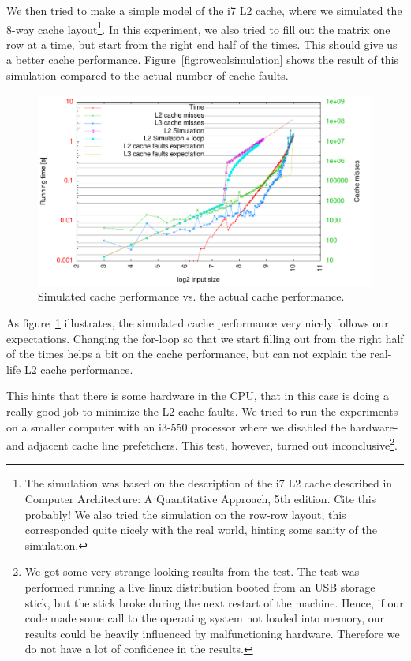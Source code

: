 We then tried to make a simple model of the i7 L2 cache, where we
simulated the 8-way cache layout\footnote{The simulation was based on
  the description of the i7 L2 cache described in Computer
  Architecture: A Quantitative Approach, 5th edition. Cite this
  probably! We also tried the simulation on the row-row layout, this
  corresponded quite nicely with the real world, hinting some sanity
  of the simulation.}. In this experiment, we also tried to fill out
the matrix one row at a time, but start from the right end half of the
times. This should give us a better cache
performance. Figure~\ref{fig:rowcolsimulation} shows the result of
this simulation compared to the actual number of cache faults.
\begin{figure}[h!]
  \centering
  \includegraphics[width=\textwidth]{plots/rowcol_simulation}
  \caption{Simulated cache performance vs. the actual cache performance.}
  \label{fig:rowcol_simulation}
\end{figure}

As figure~\ref{fig:rowcol_simulation} illustrates, the simulated cache
performance very nicely follows our expectations. Changing the
for-loop so that we start filling out from the right half of the times
helps a bit on the cache performance, but can not explain the
real-life L2 cache performance.

This hints that there is some hardware in the CPU, that in this case
is doing a really good job to minimize the L2 cache faults. We tried
to run the experiments on a smaller computer with an i3-550 processor
where we disabled the hardware- and adjacent cache line
prefetchers. This test, however, turned out inconclusive\footnote{We
  got some very strange looking results from the test. The test was
  performed running a live linux distribution booted from an USB
  storage stick, but the stick broke during the next restart of the
  machine. Hence, if our code made some call to the operating system
  not loaded into memory, our results could be heavily influenced by
  malfunctioning hardware. Therefore we do not have a lot of
  confidence in the results.}.

